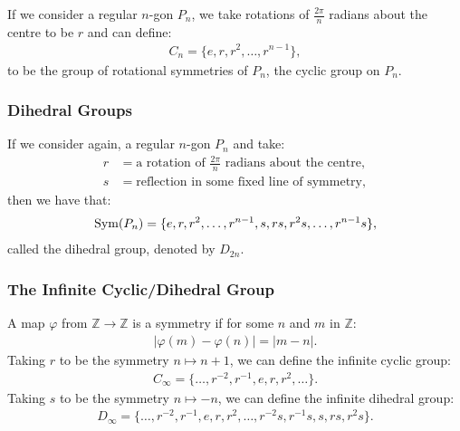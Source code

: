If we consider a regular $n$-gon $P_n$, we take rotations of
$\frac{2\pi}{n}$ radians about the centre to be $r$ and can define: \begin{align*}
    C_n = \{e, r, r^2, \ldots, r^{n - 1}\},
\end{align*} to be the group of rotational symmetries of $P_n$, the cyclic
group on $P_n$.

\subsubsection{Dihedral Groups}

If we consider again, a regular $n$-gon $P_n$ and take: \begin{align*}
    r &= \text{a rotation of } \frac{2\pi}{n} \text{ radians about the centre}, \\
    s &= \text{reflection in some fixed line of symmetry},
\end{align*} then we have that: \begin{align*}
    \operatorname{Sym}(P_n) = \{e, r, r^2, \ldots, r^{n - 1}, s, rs, r^2s, \ldots, r^{n - 1}s\},
\end{align*} called the dihedral group, denoted by $D_{2n}$.

\subsubsection{The Infinite Cyclic/Dihedral Group}

A map $\varphi$ from $\mathbb{Z} \to \mathbb{Z}$ is a symmetry if for some
$n$ and $m$ in $\mathbb{Z}$: \begin{align*}
    |\varphi(m) - \varphi(n)| = |m - n|.
\end{align*} Taking $r$ to be the symmetry $n \mapsto n + 1$, we can define the
infinite cyclic group: \begin{align*}
    C_\infty = \{\ldots, r^{-2}, r^{-1}, e, r, r^2, \ldots\}.
\end{align*} Taking $s$ to be the symmetry $n \mapsto -n$, we can define the
infinite dihedral group: \begin{align*}
    D_\infty = \{\ldots, r^{-2}, r^{-1}, e, r, r^2, \ldots, r^{-2}s, r^{-1}s, s, rs, r^2s\}.
\end{align*}